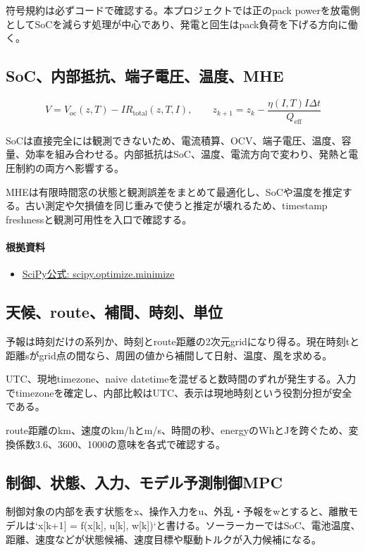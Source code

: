 \documentclass[a4paper,11pt]{article}
\begin{document}
符号規約は必ずコードで確認する。本プロジェクトでは正のpack powerを放電側としてSoCを減らす処理が中心であり、発電と回生はpack負荷を下げる方向に働く。



\subsection{SoC、内部抵抗、端子電圧、温度、MHE}
\[
V=V_{\mathrm{oc}}(z,T)-IR_{\mathrm{total}}(z,T,I),\qquad z_{k+1}=z_k-\frac{\eta(I,T)I\Delta t}{Q_{\mathrm{eff}}}
\]

SoCは直接完全には観測できないため、電流積算、OCV、端子電圧、温度、容量、効率を組み合わせる。内部抵抗はSoC、温度、電流方向で変わり、発熱と電圧制約の両方へ影響する。


MHEは有限時間窓の状態と観測誤差をまとめて最適化し、SoCや温度を推定する。古い測定や欠損値を同じ重みで使うと推定が壊れるため、timestamp freshnessと観測可用性を入口で確認する。

\paragraph{根拠資料}
\begin{itemize}[leftmargin=1.6em]
\item \href{https://docs.scipy.org/doc/scipy/reference/generated/scipy.optimize.minimize.html}{SciPy公式: scipy.optimize.minimize}
\end{itemize}

\subsection{天候、route、補間、時刻、単位}
予報は時刻だけの系列か、時刻とroute距離の2次元gridになり得る。現在時刻tと距離sがgrid点の間なら、周囲の値から補間して日射、温度、風を求める。


UTC、現地timezone、naive datetimeを混ぜると数時間のずれが発生する。入力でtimezoneを確定し、内部比較はUTC、表示は現地時刻という役割分担が安全である。


route距離のkm、速度のkm/hとm/s、時間の秒、energyのWhとJを跨ぐため、変換係数3.6、3600、1000の意味を各式で確認する。



\subsection{制御、状態、入力、モデル予測制御MPC}
制御対象の内部を表す状態をx、操作入力をu、外乱・予報をwとすると、離散モデルは`x[k+1] = f(x[k], u[k], w[k])`と書ける。ソーラーカーではSoC、電池温度、距離、速度などが状態候補、速度目標や駆動トルクが入力候補になる。
\end{document}
